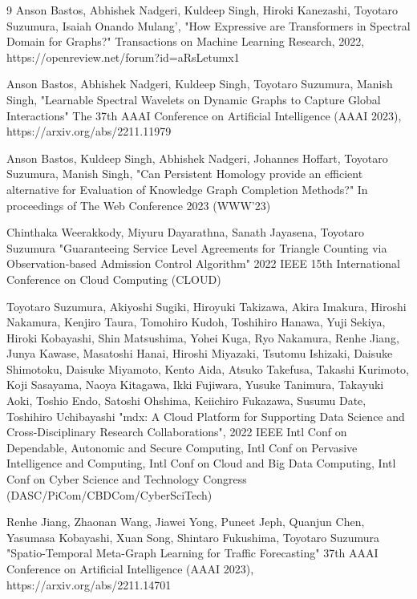 

% 

\begin{査読付}{9}
Anson Bastos, Abhishek Nadgeri, Kuldeep Singh, Hiroki Kanezashi, Toyotaro Suzumura, Isaiah Onando Mulang', 
"How Expressive are Transformers in Spectral Domain for Graphs?"
Transactions on Machine Learning Research, 2022, https://openreview.net/forum?id=aRsLetumx1

Anson Bastos, Abhishek Nadgeri, Kuldeep Singh, Toyotaro Suzumura, Manish Singh,
"Learnable Spectral Wavelets on Dynamic Graphs to Capture Global Interactions"
The 37th AAAI Conference on Artificial Intelligence (AAAI 2023), https://arxiv.org/abs/2211.11979

Anson Bastos, Kuldeep Singh, Abhishek Nadgeri, Johannes Hoffart, Toyotaro Suzumura, Manish Singh,
"Can Persistent Homology provide an efficient alternative for Evaluation of Knowledge Graph Completion Methods?"
In proceedings of The Web Conference 2023 (WWW'23)


Chinthaka Weerakkody, Miyuru Dayarathna, Sanath Jayasena, Toyotaro Suzumura
"Guaranteeing Service Level Agreements for Triangle Counting via Observation-based Admission Control Algorithm"
2022 IEEE 15th International Conference on Cloud Computing (CLOUD)

Toyotaro Suzumura, Akiyoshi Sugiki, Hiroyuki Takizawa, Akira Imakura, Hiroshi Nakamura, Kenjiro Taura, Tomohiro Kudoh, Toshihiro Hanawa, Yuji Sekiya, Hiroki Kobayashi, Shin Matsushima, Yohei Kuga, Ryo Nakamura, Renhe Jiang, Junya Kawase, Masatoshi Hanai, Hiroshi Miyazaki, Tsutomu Ishizaki, Daisuke Shimotoku, Daisuke Miyamoto, Kento Aida, Atsuko Takefusa, Takashi Kurimoto, Koji Sasayama, Naoya Kitagawa, Ikki Fujiwara, Yusuke Tanimura, Takayuki Aoki, Toshio Endo, Satoshi Ohshima, Keiichiro Fukazawa, Susumu Date, Toshihiro Uchibayashi
"mdx: A Cloud Platform for Supporting Data Science and Cross-Disciplinary Research Collaborations", 2022 IEEE Intl Conf on Dependable, Autonomic and Secure Computing, Intl Conf on Pervasive Intelligence and Computing, Intl Conf on Cloud and Big Data Computing, Intl Conf on Cyber Science and Technology Congress (DASC/PiCom/CBDCom/CyberSciTech)


Renhe Jiang, Zhaonan Wang, Jiawei Yong, Puneet Jeph, Quanjun Chen, Yasumasa Kobayashi, Xuan Song, Shintaro Fukushima, Toyotaro Suzumura
"Spatio-Temporal Meta-Graph Learning for Traffic Forecasting"
37th AAAI Conference on Artificial Intelligence (AAAI 2023), https://arxiv.org/abs/2211.14701


\end{査読付}
